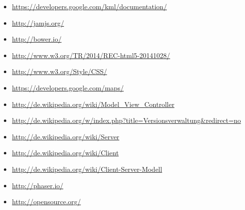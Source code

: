 \documentclass[11pt,a4paper]{article}
\begin{document}
\begin{itemize}
\item \url{https://developers.google.com/kml/documentation/}
\item \url{http://jamjs.org/}
\item \url{http://bower.io/}
\item \url{http://www.w3.org/TR/2014/REC-html5-20141028/}
\item \url{http://www.w3.org/Style/CSS/}
\item \url{https://developers.google.com/maps/}
\item \url{http://de.wikipedia.org/wiki/Model_View_Controller}
\item \url{http://de.wikipedia.org/w/index.php?title=Versionsverwaltung&redirect=no}
\item \url{http://de.wikipedia.org/wiki/Server}
\item \url{http://de.wikipedia.org/wiki/Client}
\item \url{http://de.wikipedia.org/wiki/Client-Server-Modell}
\item \url{http://phaser.io/}
\item \url{http://opensource.org/}


\end{itemize}
\end{document}
